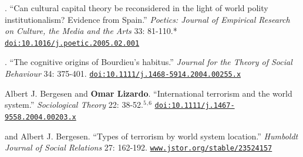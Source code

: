 
.  ``Can cultural capital theory be reconsidered in the light of world polity institutionalism? Evidence from Spain.'' {\em Poetics:  Journal of Empirical Research on Culture, the Media and the Arts} 33: 81-110.\textcolor{uclablue}{*} \href{https://doi.org/10.1016/j.poetic.2005.02.001}{\nolinkurl{doi:10.1016/j.poetic.2005.02.001}} 

. ``The cognitive origins of Bourdieu's habitus.'' {\em Journal for the Theory of Social Behaviour} 34: 375-401. \href{https://doi.org/10.1111/j.1468-5914.2004.00255.x}{\nolinkurl{doi:10.1111/j.1468-5914.2004.00255.x}}

\ind Albert J. Bergesen and {\bf Omar Lizardo}. ``International terrorism and the world system.'' {\em Sociological Theory} 22: 38-52.\textcolor{uclablue}{$^{5}$}$^{,}$\textcolor{uclablue}{$^{6}$} \href{https://doi.org/10.1111/j.1467-9558.2004.00203.x}{\nolinkurl{doi:10.1111/j.1467-9558.2004.00203.x}}

 and Albert J. Bergesen. ``Types of terrorism by world system location.'' {\em Humboldt Journal of Social Relations} 27: 162-192. \href{https://www.jstor.org/stable/23524157}{\nolinkurl{www.jstor.org/stable/23524157}}
